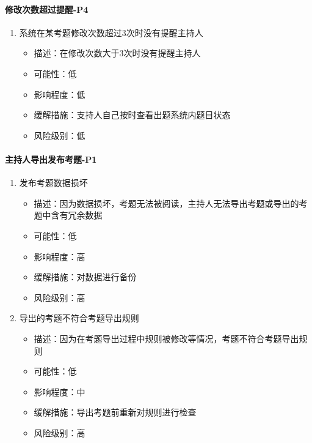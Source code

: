 \documentclass[hyperref, a4paper]{ctexart}
\providecommand{\tightlist}{%
  \setlength{\itemsep}{0pt}\setlength{\parskip}{0pt}}
\let\oldparagraph\paragraph
\renewcommand{\paragraph}[1]{\oldparagraph{#1}\mbox{}}
\begin{document}
\hypertarget{ux4feeux6539ux6b21ux6570ux8d85ux8fc7ux63d0ux9192-p4}{%
\paragraph{修改次数超过提醒-P4}\label{ux4feeux6539ux6b21ux6570ux8d85ux8fc7ux63d0ux9192-p4}}

\begin{enumerate}
\def\labelenumi{\arabic{enumi}.}
\tightlist
\item
  系统在某考题修改次数超过3次时没有提醒主持人

  \begin{itemize}
  \tightlist
  \item
    描述：在修改次数大于3次时没有提醒主持人
  \item
    可能性：低
  \item
    影响程度：低
  \item
    缓解措施：支持人自己按时查看出题系统内题目状态
  \item
    风险级别：低
  \end{itemize}
\end{enumerate}

\hypertarget{ux4e3bux6301ux4ebaux5bfcux51faux53d1ux5e03ux8003ux9898-p1}{%
\paragraph{主持人导出发布考题-P1}\label{ux4e3bux6301ux4ebaux5bfcux51faux53d1ux5e03ux8003ux9898-p1}}

\begin{enumerate}
\def\labelenumi{\arabic{enumi}.}
\tightlist
\item
  发布考题数据损坏

  \begin{itemize}
  \tightlist
  \item
    描述：因为数据损坏，考题无法被阅读，主持人无法导出考题或导出的考题中含有冗余数据
  \item
    可能性：低
  \item
    影响程度：高
  \item
    缓解措施：对数据进行备份
  \item
    风险级别：高
  \end{itemize}
\item
  导出的考题不符合考题导出规则

  \begin{itemize}
  \tightlist
  \item
    描述：因为在考题导出过程中规则被修改等情况，考题不符合考题导出规则
  \item
    可能性：低
  \item
    影响程度：中
  \item
    缓解措施：导出考题前重新对规则进行检查
  \item
    风险级别：高
  \end{itemize}
\end{enumerate}
\end{document}
